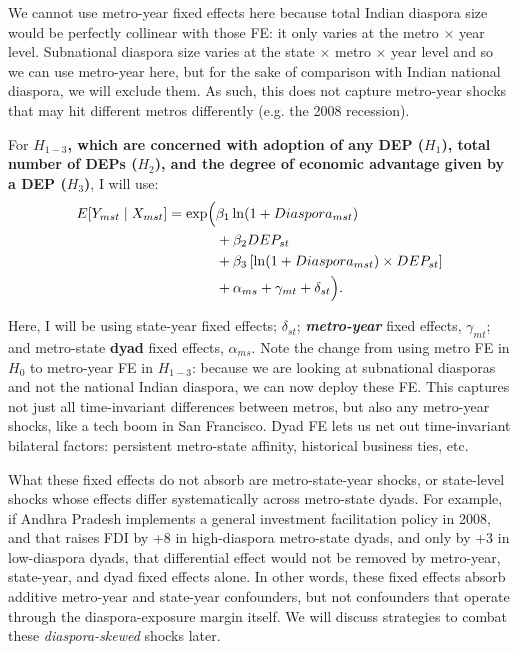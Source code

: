 \documentclass[12pt]{article}
\begin{document}
We cannot use metro-year fixed effects here because total Indian diaspora size would be perfectly collinear with those FE: it only varies at the metro $\times$ year level. Subnational diaspora size varies at the state $\times$ metro $\times$ year level and so we can use metro-year here, but for the sake of comparison with Indian national diaspora, we will exclude them. As such, this does not capture metro-year shocks that may hit different metros differently (e.g. the 2008 recession). 

For \textbf{$H_{1-3}$, which are concerned with adoption of any DEP ($H_1$), total number of DEPs ($H_2$), and the degree of economic advantage given by a DEP ($H_3$)}, I will use:
\[
\begin{aligned}
E[Y_{mst} \mid X_{mst}] =
\exp \Bigl(
&\beta_1 \ln(1+Diaspora_{mst}) \\
&+ \beta_2 DEP_{st} \\
&+ \beta_3 \left[\ln(1+Diaspora_{mst}) \times DEP_{st}\right] \\
&+ \alpha_{ms}
+ \gamma_{mt}
+ \delta_{st}
\Bigr).
\end{aligned}
\]

Here, I will be using state-year fixed effects; $\delta_{st}$; \textbf{\textit{metro-year}} fixed effects, $\gamma_{mt}$; and metro-state \textbf{dyad} fixed effects, $\alpha_{ms}$. Note the change from using metro FE in $H_0$ to metro-year FE in $H_{1-3}$: because we are looking at subnational diasporas and not the national Indian diaspora, we can now deploy these FE. This captures not just all time-invariant differences between metros, but also any metro-year shocks, like a tech boom in San Francisco. Dyad FE lets us net out time-invariant bilateral factors: persistent metro-state affinity, historical business ties, etc. 

What these fixed effects do not absorb are metro-state-year shocks, or state-level shocks whose effects differ systematically across metro-state dyads. For example, if Andhra Pradesh implements a general investment facilitation policy in 2008, and that raises FDI by +8 in high-diaspora metro-state dyads, and only by +3 in low-diaspora dyads, that differential effect would not be removed by metro-year, state-year, and dyad fixed effects alone. In other words, these fixed effects absorb additive metro-year and state-year confounders, but not confounders that operate through the diaspora-exposure margin itself. We will discuss strategies to combat these \textit{diaspora-skewed} shocks later.
\end{document}
